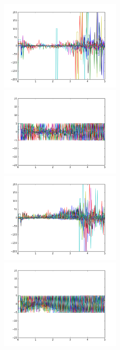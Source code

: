 \documentclass[a4paper, 11pt]{article} %
\begin{document}
\begin{figure}[H]
\begin{minipage}{0.5\linewidth}
\centerline{\includegraphics[width=6.0cm]{figure/dif_1.png}}
\end{minipage}
\hfill
\begin{minipage}{0.5\linewidth}
\centerline{\includegraphics[width=6.0cm]{figure/fitdif_1.png}}
\end{minipage}
\vfill
\begin{minipage}{0.5\linewidth}
\centerline{\includegraphics[width=6.0cm]{figure/dif_2.png}}
\end{minipage}
\hfill
\begin{minipage}{0.5\linewidth}
\centerline{\includegraphics[width=6.0cm]{figure/fitdif_2.png}}

\end{minipage}
\end{figure}
\end{document}
